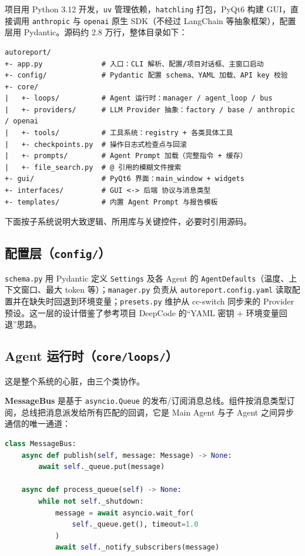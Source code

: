 \documentclass[a4paper,11pt]{article}
\begin{document}
项目用 Python 3.12 开发，\texttt{uv} 管理依赖，\texttt{hatchling} 打包，PyQt6 构建 GUI，直接调用 \texttt{anthropic} 与 \texttt{openai} 原生 SDK（不经过 LangChain 等抽象框架），配置层用 Pydantic。源码约 2.8 万行，整体目录如下：

\begin{lstlisting}[language={},basicstyle=\ttfamily\footnotesize]
autoreport/
+- app.py              # 入口：CLI 解析、配置/项目对话框、主窗口启动
+- config/             # Pydantic 配置 schema、YAML 加载、API key 校验
+- core/
|   +- loops/          # Agent 运行时：manager / agent_loop / bus
|   +- providers/      # LLM Provider 抽象：factory / base / anthropic / openai
|   +- tools/          # 工具系统：registry + 各类具体工具
|   +- checkpoints.py  # 操作日志式检查点与回滚
|   +- prompts/        # Agent Prompt 加载（完整指令 + 缓存）
|   +- file_search.py  # @ 引用的模糊文件搜索
+- gui/                # PyQt6 界面：main_window + widgets
+- interfaces/         # GUI <-> 后端 协议与消息类型
+- templates/          # 内置 Agent Prompt 与报告模板
\end{lstlisting}

下面按子系统说明大致逻辑、所用库与关键控件，必要时引用源码。

\subsection{配置层（\texttt{config/}）}

\texttt{schema.py} 用 Pydantic 定义 \texttt{Settings} 及各 Agent 的 \texttt{AgentDefaults}（温度、上下文窗口、最大 token 等）；\texttt{manager.py} 负责从 \texttt{autoreport.config.yaml} 读取配置并在缺失时回退到环境变量；\texttt{presets.py} 维护从 cc-switch 同步来的 Provider 预设。这一层的设计借鉴了参考项目 DeepCode\cite{deepcode} 的“YAML 密钥 + 环境变量回退”思路。

\subsection{Agent 运行时（\texttt{core/loops/}）}

这是整个系统的心脏，由三个类协作。

\textbf{MessageBus} 是基于 \texttt{asyncio.Queue} 的发布/订阅消息总线。组件按消息类型订阅，总线把消息派发给所有匹配的回调，它是 Main Agent 与子 Agent 之间异步通信的唯一通道：

\begin{lstlisting}[language=Python]
class MessageBus:
    async def publish(self, message: Message) -> None:
        await self._queue.put(message)

    async def process_queue(self) -> None:
        while not self._shutdown:
            message = await asyncio.wait_for(
                self._queue.get(), timeout=1.0
            )
            await self._notify_subscribers(message)
\end{lstlisting}
\end{document}
